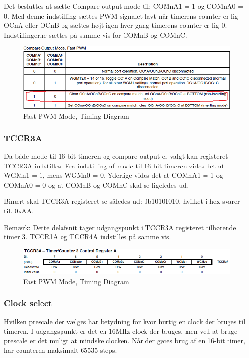 Det besluttes at sætte Compare output mode til:  COMnA1 = 1 og COMnA0 = 0.  Med denne indstilling sættes PWM signalet lavt når timerens counter er lig OCnA eller OCnB og sættes højt igen hver gang timerens counter er lig 0. Indstillingerne sættes på samme vis for COMnB og COMnC.

\begin{figure}[H]
	\centering
	\includegraphics[width=1.\textwidth]{Billeder/Timer/2_compare_output_mode.png}
	\caption{Fast PWM Mode, Timing Diagram}
	\label{fig:Timing_diagram}
\end{figure}

 

\subsubsection*{TCCR3A}
Da både mode til 16-bit timeren og compare output er valgt kan registeret TCCR3A indstilles. Fra indstilling af mode til 16-bit timeren vides det at WGMn1 = 1, mens WGMn0 = 0. Yderlige vides det at COMnA1 = 1 og COMnA0 = 0 og at COMnB og COMnC skal se ligeledes ud.

Binært skal TCCR3A registeret se således ud: 0b10101010, hvilket i hex svarer til: 0xAA. 

Bemærk: Dette delafsnit tager udgangspunkt i TCCR3A registeret tilhørende timer 3.  TCCR1A og TCCR4A indstilles på samme vis.

\begin{figure}[H]
	\centering
	\includegraphics[width=1.\textwidth]{Billeder/Timer/3_TCCT3A.png}
	\caption{Fast PWM Mode, Timing Diagram}
	\label{fig:Timing_diagram}
\end{figure}

\newpage

\subsubsection*{Clock select}
Hvilken prescale der vælges har betydning for hvor hurtig en clock der bruges til timeren. I udgangspunkt er det en 16MHz clock der bruges, men ved at bruge prescale er det muligt at mindske clocken. Når der gøres brug af en 16-bit timer, har counteren maksimalt 65535 steps. 

